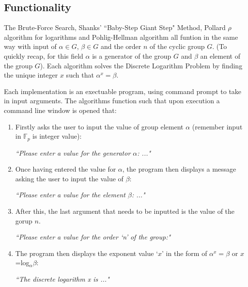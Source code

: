 \documentclass[iwp,first]{luthesis}
\begin{document}
\subsection{Functionality}

The Brute-Force Search, Shanks' ``Baby-Step Giant Step" Method, Pollard $\rho$ algorithm for logarithms and Pohlig-Hellman algorithm all funtion in the same way with input of $\alpha\in G$, $\beta \in G$ and the order $n$ of the cyclic group $G$. (To quickly recap, for this field $\alpha$ is a generator of the group $G$ and $\beta$ an element of the group $G$). Each algorithm solves the Discrete Logarithm Problem by finding the unique integer $x$ such that $\alpha^x = \beta$.

Each implementation is an exectuable program, using command prompt to take in input arguments. The algorithms function such that upon execution a command line window is opened that:

\begin{enumerate}

\item Firstly asks the user to input the value of group element $\alpha$ (remember input in $\mathbb{F}_p$ is integer value):

\begin{center}

\textit{``Please enter a value for the generator $\alpha$: ..."}

\end{center}

\item Once having entered the value for $\alpha$, the program then displays a message asking the user to input the value of $\beta$:

\begin{center}

\textit{``Please enter a value for the element $\beta$: ..."}

\end{center}

\item After this, the last argument that needs to be inputted is the value of the gorup $n$.

\begin{center}

\textit{``Please enter a value for the order `n' of the group:"}

\end{center}

\item The program then displays the exponent value `$x$' in the form of $\alpha^x = \beta$ or $x$=log$_{\alpha}\beta$:

\begin{center}

\textit{``The discrete logarithm x is ..."}

\end{center}

\end{enumerate}
\end{document}
